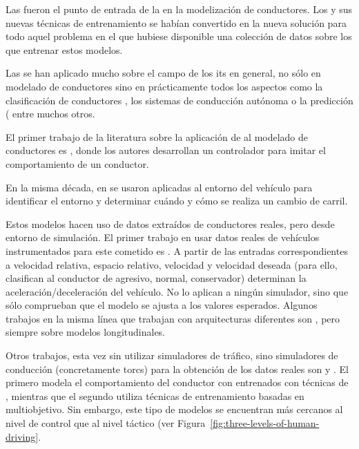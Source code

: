 {Las  fueron el punto de entrada de la  en la modelización de conductores. Los  y sus nuevas técnicas de entrenamiento se habían convertido en la nueva solución para todo aquel problema en el que hubiese disponible una colección de datos sobre los que entrenar estos modelos.

Las  se han aplicado mucho sobre el campo de los \acrshort{its} en general, no sólo en modelado de conductores sino en prácticamente todos los aspectos como la clasificación de conductores \cite{DiazAlvarez2014}, los sistemas de conducción autónoma \cite{huval2015empirical} o la predicción (\cite{Dougherty1993, chan2012neural, naranjo2012floating} entre muchos otros.

El primer trabajo de la literatura sobre la aplicación de  al modelado de conductores es \cite{Fix1990}, donde los autores desarrollan un controlador para imitar el comportamiento de un conductor.

En la misma década, en \cite{Hunt1994} se usaron  aplicadas al entorno del vehículo para identificar el entorno y determinar cuándo y cómo se realiza un cambio de carril.

Estos modelos hacen uso de datos extraídos de conductores reales, pero desde entorno de simulación. El primer trabajo en usar datos reales de vehículos instrumentados para este cometido es \cite{Jia2003}. A partir de las entradas correspondientes a velocidad relativa, espacio relativo, velocidad y velocidad deseada (para ello, clasifican al conductor de agresivo, normal, conservador) determinan la aceleración/deceleración del vehículo. No lo aplican a ningún simulador, sino que sólo comprueban que el modelo se ajusta a los valores esperados. Algunos trabajos en la misma línea que trabajan con arquitecturas diferentes son \cite{Panwai2007, Khodayari2012}, pero siempre sobre modelos longitudinales.

Otros trabajos, esta vez sin utilizar simuladores de tráfico, sino simuladores de conducción (concretamente \gls{torcs}) para la obtención de los datos reales son \cite{munoz2010human} y \cite{van2009robust}. El primero modela el comportamiento del conductor con  entrenados con técnicas de \textit{}, mientras que el segundo utiliza técnicas de entrenamiento basadas en  multiobjetivo. Sin embargo, este tipo de modelos se encuentran más cercanos al nivel de control que al nivel táctico (ver Figura~\ref{fig:three-levels-of-human-driving}.

}
